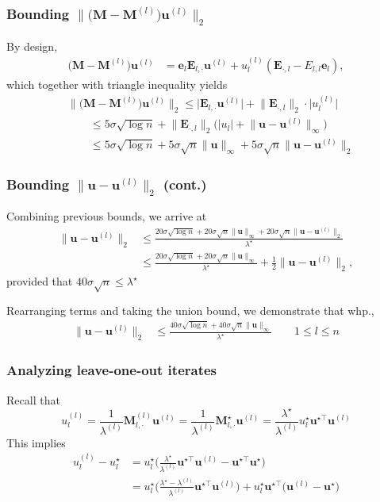 \documentclass[compress,
mathserif,wide,%
]{beamer}
\begin{document}
\begin{frame}
	\frametitle{Bounding $\|\big(\bm{M}-\bm{M}^{(l)}\big)\bm{u}^{(l)}\|_{2}$}
By design, 	
\begin{align*}
\big(\bm{M}-\bm{M}^{(l)}\big)\bm{u}^{(l)} & =\bm{e}_{l}\bm{E}_{l,\cdot}\bm{u}^{(l)}+u_{l}^{(l)}(\bm{E}_{\cdot,l} - E_{l,l}\bm{e}_{l}),
\end{align*}
which together with triangle inequality yields
\begin{align*}
 & \|\big(\bm{M}-\bm{M}^{(l)}\big)\bm{u}^{(l)}\|_{2}
	\leq \big|\bm{E}_{l,\cdot}\bm{u}^{(l)}\big|  +
	 \big\|\bm{E}_{\cdot,l}\big\|_{2} \cdot \big|u_{l}^{(l)}\big| \\
 & \qquad \leq5\sigma\sqrt{\log n}+\big\|\bm{E}_{\cdot,l}\big\|_{2}\big(\big|u_{l}\big|+\big\|\bm{u}-\bm{u}^{(l)}\big\|_{\infty}\big)\\
 & \qquad \leq5\sigma\sqrt{\log n}+5\sigma\sqrt{n}\|\bm{u}\|_{\infty}+5\sigma\sqrt{n}\big\|\bm{u}-\bm{u}^{(l)}\big\|_{2}
\end{align*}
\end{frame}

\begin{frame}
	\frametitle{Bounding $\|\bm{u} - \bm{u}^{(l)}\|_{2}$ (cont.)}
	Combining previous bounds, we arrive at
\begin{align*}
\big\|\bm{u}-\bm{u}^{(l)}\big\|_{2}
 & \leq \frac{20\sigma\sqrt{\log n}+20\sigma\sqrt{n}\|\bm{u}\|_{\infty}+20\sigma\sqrt{n}\big\|\bm{u}-\bm{u}^{(l)}\big\|_{2}}{\lambda^{\star}}\\
 & \leq\frac{20\sigma\sqrt{\log n}+20\sigma\sqrt{n}\|\bm{u}\|_{\infty}}{\lambda^{\star}}+\frac{1}{2}\big\|\bm{u}-\bm{u}^{(l)}\big\|_{2},
\end{align*}
%
provided that $40\sigma\sqrt{n}\leq \lambda^{\star}$



Rearranging terms and taking the union bound, we demonstrate that whp.,
%
\begin{align*}
\big\|\bm{u}-\bm{u}^{(l)}\big\|_{2} & \leq\frac{40\sigma\sqrt{\log n}+40\sigma\sqrt{n}\|\bm{u}\|_{\infty}}{\lambda^{\star}}  \qquad 1\leq l\leq n
\end{align*}
\end{frame}



\begin{frame}
	\frametitle{Analyzing leave-one-out iterates}
	Recall that 
	\[
	u_{l}^{(l)} =\frac{1}{\lambda^{(l)}}\bm{M}_{l,\cdot}^{(l)}\bm{u}^{(l)}=\frac{1}{\lambda^{(l)}}\bm{M}_{l,\cdot}^{\star}\bm{u}^{(l)}=\frac{\lambda^{\star}}{\lambda^{(l)}}u_{l}^{\star}\bm{u}^{\star\top}\bm{u}^{(l)}
	\]
	This implies 
	\begin{align*}
u_{l}^{(l)}-u_{l}^{\star} & %
=u_{l}^{\star}\Big(\frac{\lambda^{\star}}{\lambda^{(l)}}\bm{u}^{\star\top}\bm{u}^{(l)}-\bm{u}^{\star\top}\bm{u}^{\star}\Big)\\
 & =u_{l}^{\star}\Big(\frac{\lambda^{\star}-\lambda^{(l)}}{\lambda^{(l)}}\bm{u}^{\star\top}\bm{u}^{(l)}\Big)+u_{l}^{\star}\bm{u}^{\star\top}\big(\bm{u}^{(l)}-\bm{u}^{\star}\big)
\end{align*}
\end{frame}
\end{document}
